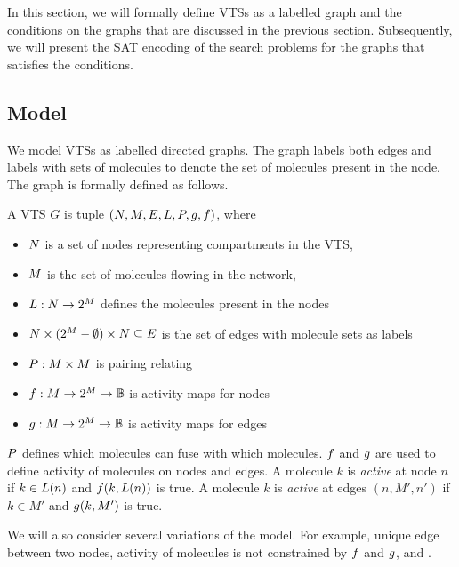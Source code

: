 In this section, we will formally define VTSs as a labelled graph
and the conditions on the graphs that are discussed in the previous
section.
Subsequently, we will present the SAT encoding of the search problems
for the graphs that satisfies the conditions.

\subsection{Model}

We model VTSs as labelled directed graphs.
The graph labels both edges and labels with sets of molecules to denote
the set of molecules present in the node.
The graph is formally defined as follows.

\begin{df}
  A VTS $G$ is tuple $(N,M,E,L,P,g,f)$, where
  \begin{itemize}
  \item $N$ is a set of nodes representing compartments in the VTS,
  \item $M$ is the set of molecules flowing in the network, 
  \item $L : N \rightarrow 2^{M}$ defines the molecules present in the nodes  
  \item $ N \times (2^{M}-\emptyset) \times N \subseteq E$ is the set of edges
    with molecule sets as labels
  \item $P : M \times M$ is pairing relating
  \item $f : M \rightarrow 2^{M} \rightarrow \mathbb{B}$ is activity maps for nodes
  \item $g : M \rightarrow 2^{M} \rightarrow \mathbb{B} $ is activity maps for edges
  \end{itemize}
\end{df}
$P$ defines which molecules can fuse with which molecules. 
$f$ and $g$ are used to define activity of molecules on nodes and edges.
A molecule $k$ is {\em active} at node $n$ if $k \in L(n)$ and $f(k,L(n))$ is true.
A molecule $k$ is {\em active} at edges $(n,M',n')$ if $k \in M'$ and $g(k,M')$ is true.

We will also consider several variations of the model.
%
For example, unique edge between two nodes, activity of molecules is not constrained by
$f$ and $g$, and .
%

